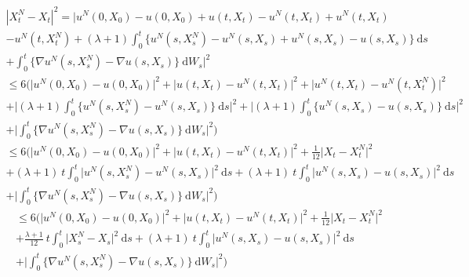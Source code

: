 \documentclass{article}[12pt]
\newcommand{\di}{\mathrm{d}}
\begin{document}
        \begin{multline*}
        \left|X^{N}_t-X_t\right|^2 = \bigg|u^N(0,X_0) - u(0,X_0) + u(t,X_t) - u^N(t,X_t)+ u^N(t,X_t)\\- u^N(t,X_t^N) + (\lambda+1)\int_0^t \{u^N(s,X_s^N)- u^N(s,X_s) + u^N(s,X_s) - u(s,X_s)\}\ \di s \\+ \int_0^t \{\nabla u^N(s,X_s^N) - \nabla u(s,X_s)\}\ \di W_s\bigg|^2
        \end{multline*}
        \begin{multline*}
        \leq 6\Bigg(\Big|u^N(0,X_0) - u(0,X_0)\Big|^2 + \Big|u(t,X_t) - u^N(t,X_t)\Big|^2 + \Big|u^N(t,X_t)- u^N(t,X_t^N)\Big|^2\\ + \bigg|(\lambda+1)\int_0^t \{u^N(s,X_s^N)- u^N(s,X_s)\}\ \di s\bigg|^2 + \bigg|(\lambda+1)\int_0^t \{u^N(s,X_s) - u(s,X_s)\}\ \di s\bigg|^2 \\+ \bigg|\int_0^t \{\nabla u^N(s,X_s^N) - \nabla u(s,X_s)\}\ \di W_s\bigg|^2 \Bigg)
        \end{multline*}
        \begin{multline*}
        \leq 6\Bigg(\Big|u^N(0,X_0) - u(0,X_0)\Big|^2 + \Big|u(t,X_t) - u^N(t,X_t)\Big|^2 + \frac{1}{12}\big|X_t- X_t^N\big|^2\\ + (\lambda+1)\ t\int_0^t \big|u^N(s,X_s^N)- u^N(s,X_s)\big|^2\ \di s + (\lambda+1)\ t\int_0^t \big|u^N(s,X_s) - u(s,X_s)\big|^2\ \di s \\+ \bigg|\int_0^t \{\nabla u^N(s,X_s^N) - \nabla u(s,X_s)\}\ \di W_s\bigg|^2 \Bigg)
        \end{multline*}
        \begin{multline*}
        \leq 6\Bigg(\Big|u^N(0,X_0) - u(0,X_0)\Big|^2 + \Big|u(t,X_t) - u^N(t,X_t)\Big|^2 + \frac{1}{12}\big|X_t- X_t^N\big|^2\\ + \frac{\lambda+1}{12}\ t\int_0^t \big|X_s^N- X_s\big|^2\ \di s + (\lambda+1)\ t\int_0^t \big|u^N(s,X_s) - u(s,X_s)\big|^2\ \di s \\+ \bigg|\int_0^t \{\nabla u^N(s,X_s^N) - \nabla u(s,X_s)\}\ \di W_s\bigg|^2 \Bigg)
        \end{multline*}
        
\end{document}
